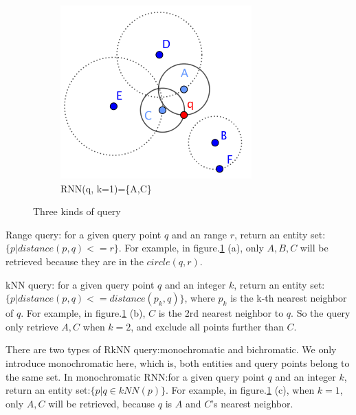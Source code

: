 \begin{figure}[htp]
\begin{subfigure}{.35\textwidth}
  \centering
  \includegraphics[width=.8\linewidth]{pic/rnn.PNG}
  \caption{RNN(q, k=1)=\{A,C\}}
\end{subfigure}
\caption{Three kinds of query}
\label{typeofquery}
\end{figure}

\begin{definition}{Range query:}
for a given query point $q$ and an range $r$, return an entity set:
$\{p | distance(p, q) <= r\}$. For example, in figure.\ref{typeofquery} (a), only $A,B,C$
will be retrieved because they are in the $circle(q, r)$.
\end{definition}

\begin{definition}{kNN query:}
for a given query point $q$ and an integer $k$, return an entity set:
$\{p | distance(p, q) <= distance(p_k, q)\}$, where $p_k$ is the k-th nearest neighbor of $q$.
For example, in figure.\ref{typeofquery} (b), $C$ is the 2rd nearest neighbor to $q$.
So the query only retrieve $A,C$ when $k=2$, and exclude all points further than $C$.
\end{definition}

There are two types of RkNN query:\@ monochromatic and bichromatic. We only introduce
monochromatic here, which is, both entities and query points belong to the same set.
In monochromatic RNN:\@ for a given query point $q$ and an integer $k$, return an entity set:\@ $\{p | q \in kNN(p)\}$.
For example, in figure.\ref{typeofquery} (c), when $k=1$, only $A,C$ will be retrieved, because $q$ is
$A$ and $C$'s nearest neighbor.

